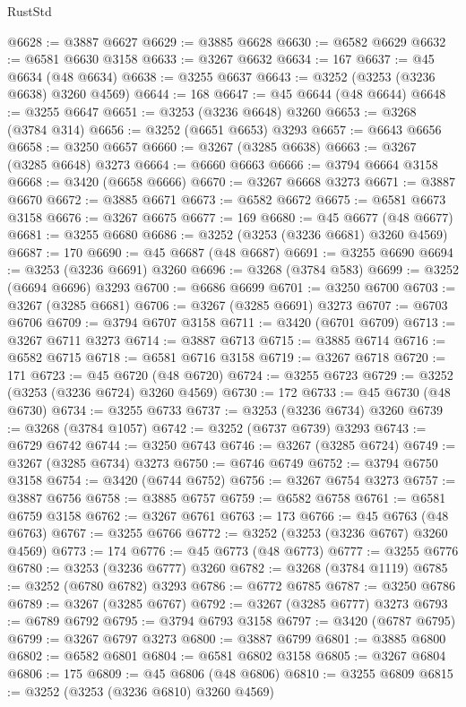 \begin{lexlean}{RustStd}
\begin{coremodule}
{\begin{coremodule}
{{{{{{{{{{{{{{{{{{{{{{{{{{{{{{{{{{{{{{{@6628 := @3887 @6627
@6629 := @3885 @6628
@6630 := @6582 @6629
@6632 := @6581 @6630 @3158
@6633 := @3267 @6632
@6634 := 167
@6637 := @45 @6634 (@48 @6634)
@6638 := @3255 @6637
@6643 := @3252 (@3253 (@3236 @6638) @3260 @4569)
@6644 := 168
@6647 := @45 @6644 (@48 @6644)
@6648 := @3255 @6647
@6651 := @3253 (@3236 @6648) @3260
@6653 := @3268 (@3784 @314)
@6656 := @3252 (@6651 @6653) @3293
@6657 := @6643 @6656
@6658 := @3250 @6657
@6660 := @3267 (@3285 @6638)
@6663 := @3267 (@3285 @6648) @3273
@6664 := @6660 @6663
@6666 := @3794 @6664 @3158
@6668 := @3420 (@6658 @6666)
@6670 := @3267 @6668 @3273
@6671 := @3887 @6670
@6672 := @3885 @6671
@6673 := @6582 @6672
@6675 := @6581 @6673 @3158
@6676 := @3267 @6675
@6677 := 169
@6680 := @45 @6677 (@48 @6677)
@6681 := @3255 @6680
@6686 := @3252 (@3253 (@3236 @6681) @3260 @4569)
@6687 := 170
@6690 := @45 @6687 (@48 @6687)
@6691 := @3255 @6690
@6694 := @3253 (@3236 @6691) @3260
@6696 := @3268 (@3784 @583)
@6699 := @3252 (@6694 @6696) @3293
@6700 := @6686 @6699
@6701 := @3250 @6700
@6703 := @3267 (@3285 @6681)
@6706 := @3267 (@3285 @6691) @3273
@6707 := @6703 @6706
@6709 := @3794 @6707 @3158
@6711 := @3420 (@6701 @6709)
@6713 := @3267 @6711 @3273
@6714 := @3887 @6713
@6715 := @3885 @6714
@6716 := @6582 @6715
@6718 := @6581 @6716 @3158
@6719 := @3267 @6718
@6720 := 171
@6723 := @45 @6720 (@48 @6720)
@6724 := @3255 @6723
@6729 := @3252 (@3253 (@3236 @6724) @3260 @4569)
@6730 := 172
@6733 := @45 @6730 (@48 @6730)
@6734 := @3255 @6733
@6737 := @3253 (@3236 @6734) @3260
@6739 := @3268 (@3784 @1057)
@6742 := @3252 (@6737 @6739) @3293
@6743 := @6729 @6742
@6744 := @3250 @6743
@6746 := @3267 (@3285 @6724)
@6749 := @3267 (@3285 @6734) @3273
@6750 := @6746 @6749
@6752 := @3794 @6750 @3158
@6754 := @3420 (@6744 @6752)
@6756 := @3267 @6754 @3273
@6757 := @3887 @6756
@6758 := @3885 @6757
@6759 := @6582 @6758
@6761 := @6581 @6759 @3158
@6762 := @3267 @6761
@6763 := 173
@6766 := @45 @6763 (@48 @6763)
@6767 := @3255 @6766
@6772 := @3252 (@3253 (@3236 @6767) @3260 @4569)
@6773 := 174
@6776 := @45 @6773 (@48 @6773)
@6777 := @3255 @6776
@6780 := @3253 (@3236 @6777) @3260
@6782 := @3268 (@3784 @1119)
@6785 := @3252 (@6780 @6782) @3293
@6786 := @6772 @6785
@6787 := @3250 @6786
@6789 := @3267 (@3285 @6767)
@6792 := @3267 (@3285 @6777) @3273
@6793 := @6789 @6792
@6795 := @3794 @6793 @3158
@6797 := @3420 (@6787 @6795)
@6799 := @3267 @6797 @3273
@6800 := @3887 @6799
@6801 := @3885 @6800
@6802 := @6582 @6801
@6804 := @6581 @6802 @3158
@6805 := @3267 @6804
@6806 := 175
@6809 := @45 @6806 (@48 @6806)
@6810 := @3255 @6809
@6815 := @3252 (@3253 (@3236 @6810) @3260 @4569)
}}}}}}}}}}}}}}}}}}}}}}}}}}}}}}}}}}}}}}}
\end{coremodule}}
\end{coremodule}
\end{lexlean}
